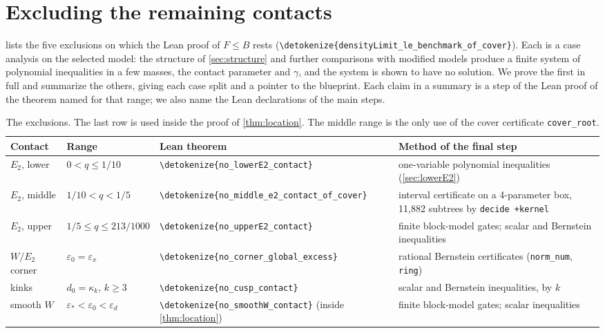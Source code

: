 \documentclass[10pt]{article}
\theoremstyle{definition}
\theoremstyle{remark}
\numberwithin{equation}{section}
\newcommand{\eps}{\varepsilon}
\newcommand{\lean}[1]{\texttt{#1}}
\newcommand{\leanid}[1]{\expandafter\nolinkurl\expandafter{\detokenize{#1}}}
\begin{document}
\section{Excluding the remaining contacts}\label{sec:exclusions}

 lists the five exclusions on which the Lean proof of $F\le B$ rests (\leanid{densityLimit_le_benchmark_of_cover}). Each is a case analysis on the selected model: the structure of \cref{sec:structure} and further comparisons with modified models produce a finite system of polynomial inequalities in a few masses, the contact parameter and $\gamma$, and the system is shown to have no solution. We prove the first in full and summarize the others, giving each case split and a pointer to the blueprint. Each claim in a summary is a step of the Lean proof of the theorem named for that range; we also name the Lean declarations of the main steps.

\begin{table}[t]
\centering\small
\begin{tabularx}{\linewidth}{@{}>{\raggedright\arraybackslash}p{2.0cm}>{\raggedright\arraybackslash}p{2.9cm}>{\raggedright\arraybackslash}p{4.0cm}>{\raggedright\arraybackslash}X@{}}
\toprule
Contact & Range & Lean theorem & Method of the final step\\
\midrule
$E_2$, lower & $0<q\le1/10$ & \leanid{no_lowerE2_contact} & one-variable polynomial inequalities (\cref{sec:lowerE2})\\
$E_2$, middle & $1/10<q<1/5$ & \leanid{no_middle_e2_contact_of_cover} & interval certificate on a 4-parameter box, 11,882 subtrees by \lean{decide +kernel}\\
$E_2$, upper & $1/5\le q\le213/1000$ & \leanid{no_upperE2_contact} & finite block-model gates; scalar and Bernstein inequalities\\
$W/E_2$ corner & $\eps_0=\eps_x$ & \leanid{no_corner_global_excess} & rational Bernstein certificates (\lean{norm\_num}, \lean{ring})\\
kinks & $d_0=\kappa_k$, $k\ge3$ & \leanid{no_cusp_contact} & scalar and Bernstein inequalities, by $k$\\
\midrule
smooth $W$ & $\eps_*<\eps_0<\eps_d$ & \leanid{no_smoothW_contact} (inside \cref{thm:location}) & finite block-model gates; scalar inequalities\\
\bottomrule
\end{tabularx}
\caption{The exclusions. The last row is used inside the proof of \cref{thm:location}. The middle range is the only use of the cover certificate \lean{cover\_root}.}
\label{tab:contacts}
\end{table}
\end{document}

